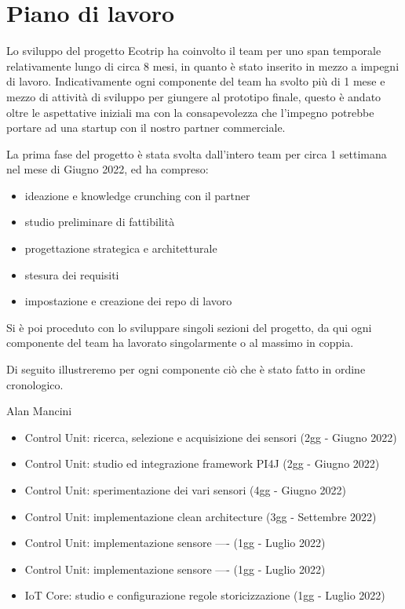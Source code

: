 
\section{Piano di lavoro}

Lo sviluppo del progetto Ecotrip ha coinvolto il team per uno span temporale relativamente lungo di circa 8 mesi, 
in quanto è stato inserito in mezzo a impegni di lavoro.
Indicativamente ogni componente del team ha svolto più di 1 mese e mezzo di attività di sviluppo per giungere al prototipo finale, 
questo è andato oltre le aspettative iniziali ma con la consapevolezza che l'impegno potrebbe portare ad una startup 
con il nostro partner commerciale.

La prima fase del progetto è stata svolta dall'intero team per circa 1 settimana nel mese di Giugno 2022, ed ha compreso:
\begin{itemize}
    \item ideazione e knowledge crunching con il partner
    \item studio preliminare di fattibilità
    \item progettazione strategica e architetturale
    \item stesura dei requisiti
    \item impostazione e creazione dei repo di lavoro
\end{itemize}

Si è poi proceduto con lo sviluppare singoli sezioni del progetto, da qui ogni componente del team ha lavorato singolarmente o al massimo in coppia.

Di seguito illustreremo per ogni componente ciò che è stato fatto in ordine cronologico.

Alan Mancini
\begin{itemize}
    \item Control Unit: ricerca, selezione e acquisizione dei sensori (2gg - Giugno 2022)
    \item Control Unit: studio ed integrazione framework PI4J (2gg - Giugno 2022) 
    \item Control Unit: sperimentazione dei vari sensori (4gg - Giugno 2022)
    \item Control Unit: implementazione clean architecture (3gg - Settembre 2022)
    \item Control Unit: implementazione sensore ---- (1gg - Luglio 2022)
    \item Control Unit: implementazione sensore ---- (1gg - Luglio 2022)
    \item IoT Core: studio e configurazione regole storicizzazione (1gg - Luglio 2022)
\end{itemize}

